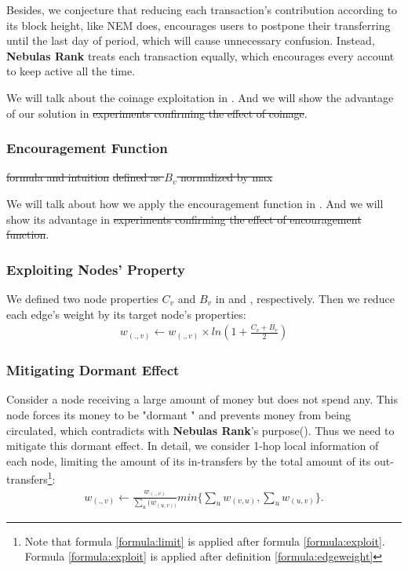 Besides, we conjecture that reducing each transaction's contribution according to its block height, like NEM does\cite{nem}, encourages users to postpone their transferring until the last day of period, which will cause unnecessary confusion. Instead, \textbf{Nebulas Rank} treats each transaction equally, which encourages every account to keep active all the time.

We will talk about the coinage exploitation in . And we will show the advantage of our solution in  \st{experiments confirming the effect of coinage}.


\subsubsection{Encouragement Function}\label{subsec:encouragement}
\st{formula and intuition} \st{defined as $B_v$ normalized by max}

We will talk about how we apply the encouragement function in . And we will show its advantage in  \st{experiments confirming the effect of encouragement function}.

\subsubsection{Exploiting Nodes' Property} \label{subsec:reduction}
We defined two node properties $C_v$ and $B_v$ in  and , respectively. Then we reduce each edge's weight by its target node's properties:
\begin{align}\label{formula:exploit}
	w_{(.,v)} \leftarrow w_{(.,v)} \times ln(1 + \frac{C_v + B_v}{2})
\end{align}

\subsubsection{Mitigating Dormant Effect} \label{subsec:limit}
Consider a node receiving a large amount of money but does not spend any. This node forces its money to be "dormant " and prevents money from being circulated, which contradicts with \textbf{Nebulas Rank}'s purpose(). Thus we need to mitigate this dormant effect. In detail, we consider 1-hop local information of each node, limiting the amount of its in-transfers by the total amount of its out-transfers\footnote{Note that formula \ref{formula:limit} is applied after formula \ref{formula:exploit}. Formula  \ref{formula:exploit} is applied after definition \ref{formula:edgeweight}}:
\begin{align}
\label{formula:limit}
w_{(.,v)} \leftarrow  \frac{w_{(.,v)}}{\sum_u(w_{(u,v))}} min\{ \sum_u{w_{(v,u)}}, \sum_u{w_{(u,v)}} \}.
\end{align}

